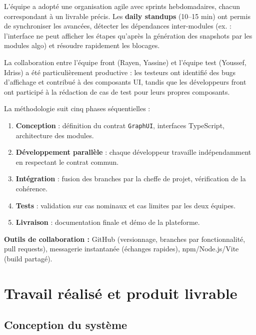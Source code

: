 \documentclass[a4paper,12pt]{report}
\begin{document}
L'équipe a adopté une organisation agile avec sprints hebdomadaires, chacun correspondant à un livrable précis. Les \textbf{daily standups} (10--15 min) ont permis de synchroniser les avancées, détecter les dépendances inter-modules (ex. : l'interface ne peut afficher les étapes qu'après la génération des snapshots par les modules algo) et résoudre rapidement les blocages.

La collaboration entre l'équipe front (Rayen, Yassine) et l'équipe test (Youssef, Idriss) a été particulièrement productive : les testeurs ont identifié des bugs d'affichage et contribué à des composants UI, tandis que les développeurs front ont participé à la rédaction de cas de test pour leurs propres composants.

La méthodologie suit cinq phases séquentielles :

\begin{enumerate}[leftmargin=1.5cm]
  \item \textbf{Conception} : définition du contrat \texttt{GraphUI}, interfaces TypeScript, architecture des modules.
  \item \textbf{Développement parallèle} : chaque développeur travaille indépendamment en respectant le contrat commun.
  \item \textbf{Intégration} : fusion des branches par la cheffe de projet, vérification de la cohérence.
  \item \textbf{Tests} : validation sur cas nominaux et cas limites par les deux équipes.
  \item \textbf{Livraison} : documentation finale et démo de la plateforme.
\end{enumerate}

\textbf{Outils de collaboration :} GitHub (versionnage, branches par fonctionnalité, pull requests), messagerie instantanée (échanges rapides), npm/Node.js/Vite (build partagé).

\clearpage


\chapter{Travail réalisé et produit livrable}

 

\section{Conception du système}
\end{document}
